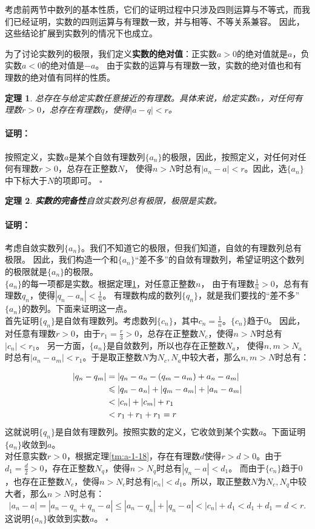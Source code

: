 \documentclass[12pt,UTF8]{ctexbook}
\newtheorem{tm}{定理}[section]
\newenvironment{proof2}{\paragraph{\textbf{证明：}}}{\hfill$\square$}
\begin{document}
\begin{appendix}
考虑前两节中数列的基本性质，它们的证明过程中只涉及四则运算与不等式，而我们已经证明，实数的四则运算与有理数一致，并与相等、不等关系兼容。
因此，这些结论扩展到实数列的情况下也成立。

为了讨论实数列的极限，我们定义\textbf{实数的绝对值}：正实数$a>0$的绝对值就是$a$，负实数$a<0$的绝对值是$-a$。
由于实数的运算与有理数一致，实数的绝对值也和有理数的绝对值有同样的性质。

\begin{tm}\label{tm:a-1-35}
    总存在与给定实数任意接近的有理数。具体来说，给定实数$a$，对任何有理数$r>0$，总存在有理数$q$，使得$|a - q| < r$。
\end{tm}
\begin{proof2}
    按照定义，实数$a$是某个自敛有理数列$\{a_n\}$的极限，因此，按照定义，对任何对任何有理数$r>0$，总存在正整数$N$，
    使得$n>N$时总有$|a_n - a| < r$。因此，选$\{a_n\}$中下标大于$N$的项即可。
\end{proof2}

\begin{tm}\textbf{实数的完备性}\label{tm:a-1-40}
    自敛实数列总有极限，极限是实数。
\end{tm}

\begin{proof2}
    考虑自敛实数列$\{a_n\}$。我们不知道它的极限，但我们知道，自敛的有理数列总有极限。
    因此，我们构造一个和$\{a_n\}$“差不多”的自敛有理数列，希望证明这个数列的极限就是$\{a_n\}$的极限。\\
    $\{a_n\}$的每一项都是实数。根据定理\ref{tm:a-1-35}，对任意正整数$n$，
    由于有理数$\frac{1}{n}>0$，总有有理数$q_n$，使得$|q_n - a_n| < \frac{1}{n}$。
    有理数构成的数列$\{q_n\}$，就是我们要找的“差不多”$\{a_n\}$的数列。下面来证明这一点。\\
    首先证明$\{q_n\}$是自敛有理数列。考虑数列$\{c_n\}$，其中$c_n = \frac{1}{n}$。$\{c_n\}$趋于$0$。
    因此，对任意有理数$r>0$，由于$r_1 = \frac{r}{3} > 0$，总存在正整数$N_c$，使得$n>N$时总有$|c_n| < r_1$。
    另一方面，$\{a_n\}$是自敛数列，所以也存在正整数$N_a$，
    使得$n,m>N_a$时总有$|a_n - a_m| < r_1$。于是取正整数$N$为$N_c,N_a$中较大者，那么$n,m>N$时总有：

    \begin{align}
        |q_n - q_m| &= |q_n - a_n - (q_m - a_m) + a_n -a_m| \notag \\
        &\leqslant |q_n - a_n| + |q_m - a_m| + |a_n - a_m| \notag \\
        &< |c_n| + |c_m| + r_1 \notag \\
        &< r_1 + r_1 + r_1 = r \notag
    \end{align}
    这就说明$\{q_n\}$是自敛有理数列。按照实数的定义，它收敛到某个实数$a$。下面证明$\{a_n\}$收敛到$a$。\\
    对任意实数$r>0$，根据定理\ref{tm:a-1-18}，存在有理数$d$使得$r>d>0$。由于$d_1 = \frac{d}{2}>0$，存在正整数$N_q$，使得$n>N_q$时总有$|q_n - a| < d_1$。
    而由于$\{c_n\}$趋于$0$，也存在正整数$N_c$，使得$n>N_c$时总有$|c_n| < d_1$。所以，取正整数$N$为$N_c,N_q$中较大者，那么$n>N$时总有：
    $$ |a_n - a| = |a_n - q_n + q_n - a| \leqslant |a_n - q_n| + |q_n - a| < |c_n| + d_1 < d_1 + d_1 = d < r.$$
    这说明$\{a_n\}$收敛到实数$a$。
\end{proof2}


\end{appendix}
\end{document}
